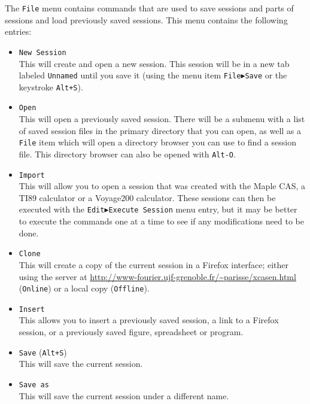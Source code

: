 \documentclass[a4paper,11pt]{book}
\begin{document}
The \texttt{File} menu contains commands that are used to save
sessions and parts of sessions and load previously saved sessions.
This menu contains the following entries: 
\begin{itemize}
  \item
  \texttt{New Session}\\
  This will create and open a new session.
  This session will be in a new tab labeled \texttt{Unnamed} until you save it
  (using the menu item \texttt{File$\blacktriangleright$Save} or the
  keystroke \texttt{Alt+S}).

  \item
  \texttt{Open}\\
  This will open a previously saved session.
  There will be a submenu with a list of saved session files in the
  primary directory that you can open, as well as a \texttt{File} item
  which will open a directory browser you can use to find a session
  file.  This directory browser can also be opened with \texttt{Alt-O}.
  
  \item
  \texttt{Import}\\
  This will allow you to open a session that
  was created with the Maple CAS, a TI89 calculator or a Voyage200
  calculator.  These sessions can then be executed with the
  \texttt{Edit$\blacktriangleright$Execute Session} menu entry, but it
  may be better to execute the commands one at a time to see if any
  modifications need to be done.

  \item 
  \texttt{Clone}\\
  This will create a copy of the current session in a Firefox
  interface; either using the server at
  \url{http://www-fourier.ujf-grenoble.fr/~parisse/xcasen.html} 
  (\texttt{Online}) or a local copy (\texttt{Offline}).

  \item
  \texttt{Insert}\\
  This allows you to insert a previously saved session, a link to a
  Firefox session, or a previously saved figure, spreadsheet or program.

  \item
  \texttt{Save} (\texttt{Alt+S})\\
  This will save the current session.

  \item
  \texttt{Save as}\\
  This will save the current session under a
  different name.


\end{itemize}
\end{document}
